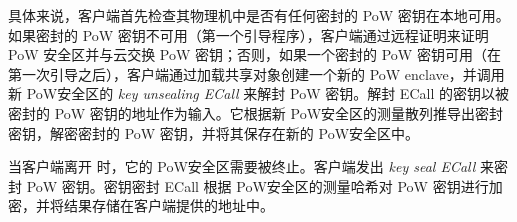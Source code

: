 具体来说，客户端首先检查其物理机中是否有任何密封的 PoW 密钥在本地可用。如果密封的 PoW 密钥不可用（第一个引导程序），客户端通过远程证明来证明 PoW 安全区并与云交换 PoW 密钥；否则，如果一个密封的 PoW 密钥可用（在第一次引导之后），客户端通过加载共享对象创建一个新的 PoW enclave，并调用新 PoW安全区的 \textit{ key unsealing ECall} 来解封 PoW 密钥。解封 ECall 的密钥以被密封的 PoW 密钥的地址作为输入。它根据新 PoW安全区的测量散列推导出密封密钥，解密密封的 PoW 密钥，并将其保存在新的 PoW安全区中。

当客户端离开 \sysnameS 时，它​​的 PoW安全区需要被终止。客户端发出 \textit{ key seal ECall} 来密封 PoW 密钥。密钥密封 ECall 根据 PoW安全区的测量哈希对 PoW 密钥进行加密，并将结果存储在客户端提供的地址中。